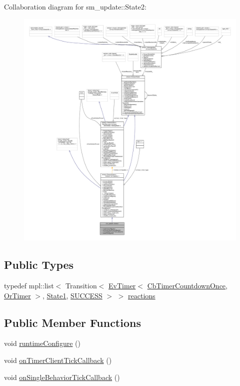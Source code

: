Collaboration diagram for sm\+\_\+update\+:\+:State2\+:
\nopagebreak
\begin{figure}[H]
\begin{center}
\leavevmode
\includegraphics[width=350pt]{structsm__update_1_1State2__coll__graph}
\end{center}
\end{figure}
\subsection*{Public Types}
\begin{DoxyCompactItemize}
\item 
typedef mpl\+::list$<$ Transition$<$ \hyperlink{structros__timer__client_1_1EvTimer}{Ev\+Timer}$<$ \hyperlink{classros__timer__client_1_1CbTimerCountdownOnce}{Cb\+Timer\+Countdown\+Once}, \hyperlink{classsm__update_1_1OrTimer}{Or\+Timer} $>$, \hyperlink{structsm__update_1_1State1}{State1}, \hyperlink{structsmacc_1_1default__transition__tags_1_1SUCCESS}{S\+U\+C\+C\+E\+SS} $>$ $>$ \hyperlink{structsm__update_1_1State2_a6030dbce2602c3a49aae0a372e46e4df}{reactions}
\end{DoxyCompactItemize}
\subsection*{Public Member Functions}
\begin{DoxyCompactItemize}
\item 
void \hyperlink{structsm__update_1_1State2_a4b85c8a77894cc78f017da0de9e2bfa3}{runtime\+Configure} ()
\item 
void \hyperlink{structsm__update_1_1State2_a217fac4964c4905921e215805f8b80be}{on\+Timer\+Client\+Tick\+Callback} ()
\item 
void \hyperlink{structsm__update_1_1State2_a652c5a4944bcff8dcb237937b340b7dd}{on\+Single\+Behavior\+Tick\+Callback} ()
\end{DoxyCompactItemize}
